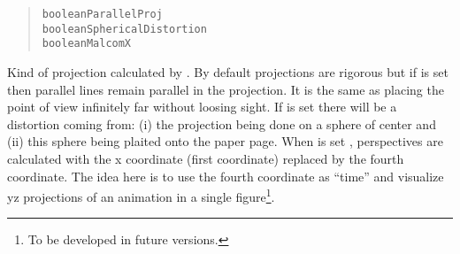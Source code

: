 \begin{quote}
\begin{alltt}
boolean ParallelProj
boolean SphericalDistortion
boolean MalcomX
\end{alltt}
\end{quote}
Kind of projection calculated by .
By default projections
are rigorous but if  is set
 then
parallel lines remain parallel in the projection.
It is the same as
placing the point of view infinitely far without loosing
sight.
If  is set 
there will be a
distortion coming from: (i) the projection being done
on a sphere of
center  and (ii) this sphere being plaited
onto the paper page.
When  is set , perspectives are calculated
with the x coordinate (first coordinate) replaced by the fourth
coordinate. The idea here is to use the fourth coordinate as ``time''
and visualize yz projections of an animation in a single
figure\footnote{To be developed in future versions.}.   


